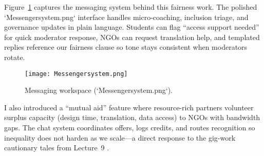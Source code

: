 Figure~\ref{fig:chat-system} captures the messaging system behind this fairness work. The polished `Messengersystem.png` interface handles micro-coaching, inclusion triage, and governance updates in plain language. Students can flag ``access support needed'' for quick moderator response, NGOs can request translation help, and templated replies reference our fairness clause so tone stays consistent when moderators rotate.

\begin{figure}[h]
  \centering
  \texttt{[image: Messengersystem.png]}
  \caption{Messaging workspace (`Messengersystem.png`).}
  \label{fig:chat-system}
\end{figure}

I also introduced a ``mutual aid'' feature where resource-rich partners volunteer surplus capacity (design time, translation, data access) to NGOs with bandwidth gaps. The chat system coordinates offers, logs credits, and routes recognition so inequality does not harden as we scale---a direct response to the gig-work cautionary tales from Lecture~9 \citep{Lecture09}.
